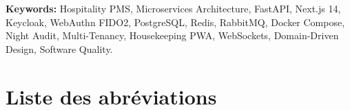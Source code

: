 \documentclass[12pt,a4paper,oneside]{report}
\begin{document}
\vspace{0.8cm}
\noindent\textbf{Keywords:} Hospitality PMS, Microservices Architecture, FastAPI, Next.js 14, Keycloak, WebAuthn FIDO2, PostgreSQL, Redis, RabbitMQ, Docker Compose, Night Audit, Multi-Tenancy, Housekeeping PWA, WebSockets, Domain-Driven Design, Software Quality.

\clearpage

\chapter*{Liste des abréviations}
\end{document}
